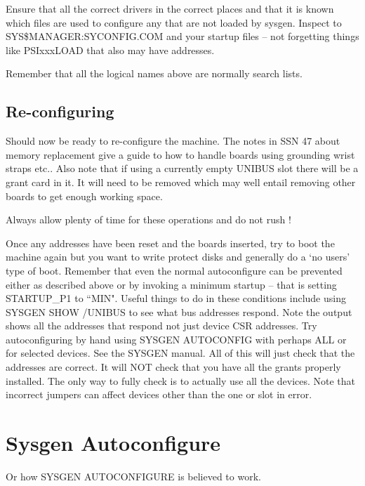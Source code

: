  Ensure that all the correct drivers in the correct places
 and that it is known which files are used to configure any that are not loaded
 by sysgen. Inspect to SYS\$MANAGER:SYCONFIG.COM and your startup files -- not
 forgetting things like PSIxxxLOAD that also may have addresses.

 Remember that all the logical names above are normally search lists.

\subsection{Re-configuring}

Should now be ready to re-configure the machine.
The notes in SSN 47 about memory replacement give a guide to how to handle
boards using  grounding wrist straps etc..
Also note that if using a currently  empty UNIBUS slot there will be a grant
card in it. It will need to be removed which may well entail removing other
boards to get enough working space.

Always allow plenty of time for these operations and do not rush !

Once any addresses have been reset and the boards inserted,
try to boot the machine again but you want to write protect disks and
generally do a `no users' type of boot.
Remember that even the normal autoconfigure can be prevented either as
described above or by invoking a minimum startup -- that is setting
STARTUP\_P1 to ``MIN".
Useful things  to do in these conditions include using
SYSGEN SHOW /UNIBUS to see what  bus addresses respond.
Note the output shows all the addresses that respond not just device CSR
addresses.
Try autoconfiguring  by hand using SYSGEN AUTOCONFIG  with perhaps ALL or for
selected devices.
See  the SYSGEN manual.
All of this will just check that the addresses are correct.
It will NOT check that you have all the grants properly installed.
The  only way to fully check is to actually use all the
devices.
Note that  incorrect jumpers can affect devices other than the one
or slot in error.

\appendix
\section{Sysgen Autoconfigure}

Or how SYSGEN AUTOCONFIGURE is believed to work.

